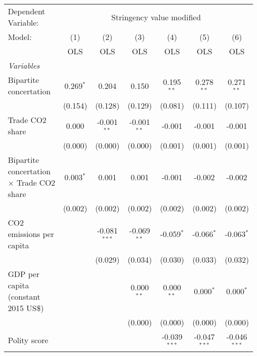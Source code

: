 
\begingroup
\centering
\begin{tabular}{lcccccc}
   \toprule
   Dependent Variable: & \multicolumn{6}{c}{Stringency value modified}\\
   Model:                                           & (1)         & (2)            & (3)           & (4)            & (5)            & (6)\\  
                                                    &  OLS        & OLS            & OLS           & OLS            & OLS            & OLS\\  
   \midrule
   \emph{Variables}\\
   Bipartite concertation                           & 0.269$^{*}$ & 0.204          & 0.150         & 0.195$^{**}$   & 0.278$^{**}$   & 0.271$^{**}$\\   
                                                    & (0.154)     & (0.128)        & (0.129)       & (0.081)        & (0.111)        & (0.107)\\   
   Trade CO2 share                                  & 0.000       & -0.001$^{**}$  & -0.001$^{**}$ & -0.001         & -0.001         & -0.001\\   
                                                    & (0.000)     & (0.000)        & (0.000)       & (0.001)        & (0.001)        & (0.001)\\   
   Bipartite concertation $\times$ Trade CO2 share  & 0.003$^{*}$ & 0.001          & 0.001         & -0.001         & -0.002         & -0.002\\   
                                                    & (0.002)     & (0.002)        & (0.002)       & (0.002)        & (0.002)        & (0.002)\\   
   CO2 emissions per capita                         &             & -0.081$^{***}$ & -0.069$^{**}$ & -0.059$^{*}$   & -0.066$^{*}$   & -0.063$^{*}$\\   
                                                    &             & (0.029)        & (0.034)       & (0.030)        & (0.033)        & (0.032)\\   
   GDP per capita (constant 2015 US\$)              &             &                & 0.000$^{**}$  & 0.000$^{**}$   & 0.000$^{*}$    & 0.000$^{*}$\\   
                                                    &             &                & (0.000)       & (0.000)        & (0.000)        & (0.000)\\   
   Polity score                                     &             &                &               & -0.039$^{***}$ & -0.047$^{***}$ & -0.046$^{***}$\\   

\end{tabular}
